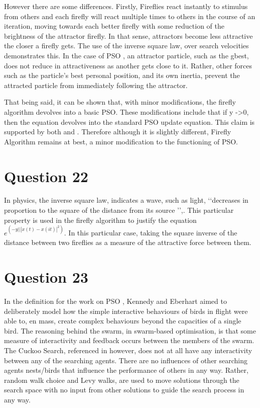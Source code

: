 \documentclass[12pt]{article}
\begin{document}
However there are some differences. Firstly, Fireflies react instantly to stimulus from others and each firefly will react multiple times to others in the course of an iteration, moving towards each better firefly with some reduction of the brightness of the attractor firefly. In that sense, attractors become less attractive the closer a firefly gets. The use of the inverse square law, over search velocities demonstrates this. In the case of PSO \cite{kennedy95}, an attractor particle, such as the gbest, does not reduce in attractiveness as another gets close to it. Rather, other forces such as the particle's best personal position, and its own inertia, prevent the attracted particle from immediately following the attractor.

That being said, it can be shown that, with minor modifications, the firefly algorithm devolves into a basic PSO. These modifications include that if y ->0, then the equation devolves into the standard PSO update equation. This claim is supported by both \cite{Weyland201597} and \cite{lones_2014}. Therefore although it is slightly different, Firefly Algorithm remains at best, a minor modification to the functioning of PSO.
\section{Question 22}
In physics, the inverse square law, indicates a wave, such as light, \lq\lq decreases in proportion to the square of the distance from its source \rq\rq,\cite{inversesquarelaw}. This particular property is used in the firefly algorithm to justify the equation $e^(-y|||x(t)-x(it)|^2)$. In this particular case, taking the square inverse of the distance between two fireflies as a measure of the attractive force between them.
\section{Question 23}
In the definition for the work on PSO \cite{kennedy95}, Kennedy and Eberhart aimed to deliberately model how the simple interactive behaviours of birds in flight were able to, en mass, create complex behaviours beyond the capacities of a single bird. The reasoning behind the swarm, in swarm-based optimisation, is that some measure of interactivity and feedback occurs between the members of the swarm. The Cuckoo Search, referenced in \cite{Jones:2011:CFA:2023607.2023640} however, does not at all have any interactivity between any of the searching agents. There are no influences of other searching agents nests/birds that influence the performance of others in any way. Rather, random walk choice and Levy walks, are used to move solutions through the search space with no input from other solutions to guide the search process in any way.
\end{document}
